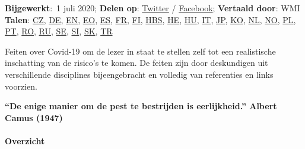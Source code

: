\textbf{Bijgewerkt}:~1 juli 2020; \textbf{Delen op}:
\href{https://twitter.com/intent/tweet?url=https://swprs.org/feiten-over-covid19/}{Twitter}
/
\href{https://www.facebook.com/share.php?u=https://swprs.org/feiten-over-covid19/}{Facebook};
\textbf{Vertaald door}: WMI\\
\textbf{Talen}: \href{https://swprs.org/fakta-o-covid-19/}{CZ},
\href{https://swprs.org/covid-19-hinweis-ii/}{DE},
\href{https://swprs.org/a-swiss-doctor-on-covid-19/}{EN},
\href{https://swprs.org/faktoj-pri-kovim-19/}{EO},
\href{https://swprs.org/hechos-sobre-covid-19/}{ES},
\href{https://swprs.org/coronavirus-un-medecin-suisse-parle/}{FR},
\href{https://swprs.org/faktoja-covid-19sta/}{FI},
\href{https://swprs.org/covid-19-cinjenice/}{HBS},
\href{https://yanivhamo.com/facts-about-covid-19-hebrew/}{HE},
\href{https://swprs.org/egy-svajci-orvos-a-covid-19-rol/}{HU},
\href{https://swprs.org/un-medico-svizzero-su-covid-19/}{IT},
\href{https://swprs.org/covid19-facts-japanese/}{JP},
\href{https://swprs.org/covid19-korean/}{KO},
\href{https://swprs.org/feiten-over-covid19/}{NL},
\href{https://midtifleisen.wordpress.com/2020/04/15/fakta-om-covid-19/}{NO},
\href{https://swprs.org/szwajcarski-lekarz-o-covid-19/}{PL},
\href{https://swprs.org/fatos-sobre-covid-19/}{PT},
\href{https://swprs.org/informatii-despre-covid-19/}{RO},
\href{https://swprs.org/\%d0\%bd\%d0\%b0-\%d0\%ba\%d0\%be\%d0\%b2\%d0\%b8\%d0\%b4-19/}{RU},
\href{https://swprs.org/fakta-om-covid-19/}{SE},
\href{http://www.ninamvseeno.org/pregled-clanka.aspx?naslov=pomembne-informacije-o-novem-koronavirusu-covid-19\&id=148}{SI},
\href{https://alatyr.sk/covid-19_swiss_propaganda_research.htm}{SK},
\href{https://swprs.org/isvicreli-bir-doktordan-kovid-19-uezerine/}{TR}

Feiten over Covid-19 om de lezer in staat te stellen zelf tot een
realistische inschatting van de risico's te komen. De feiten zijn door
deskundigen uit verschillende disciplines bijeengebracht en volledig van
referenties en links voorzien.

\textbf{``\textbf{De enige manier om de pest te bestrijden is
eerlijkheid.}'' Albert Camus (1947)}

\hypertarget{overzicht}{%
\paragraph{Overzicht}\label{overzicht}}

